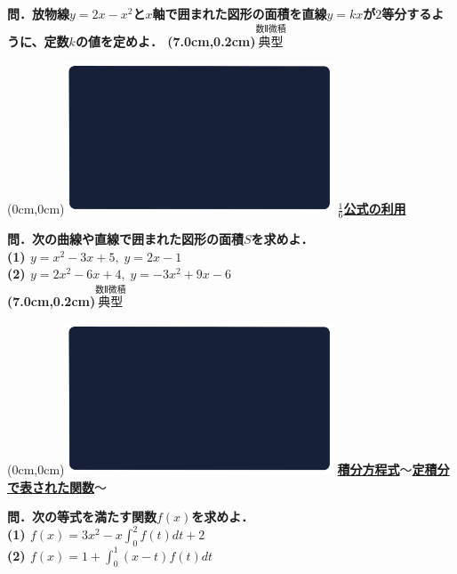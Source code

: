 \documentclass[10pt,
fleqn,
dvipdfmx,
uplatex
]{jsarticle}
\begin{document}
\LARGE 
\bf\boldmath 問．放物線$y=2x-x^2$と$x$軸で囲まれた図形の面積を直線$y=kx$が$2$等分するように、定数$k$の値を定めよ．
\at(7.0cm,0.2cm){\small\color{bradorange}$\overset{\text{数Ⅱ微積}}{\text{典型}}$}


\newpage



\at(0cm,0cm){\includegraphics[width=8cm,bb=0 0 1920 1080]{./youtube/thumbnails/templates/smart_background/数II微積.jpeg}}
{\color{orange}\bf\boldmath\LARGE\underline{$\displaystyle\frac{1}{6}$公式の利用}}\vspace{0.3zw}

\Large 
\bf\boldmath 問．次の曲線や直線で囲まれた図形の面積$S$を求めよ．\\
(1)  $y=x^2-3x+5,\;y=2x-1$\\
(2)  $y=2x^2-6x+4,\;y=-3x^2+9x-6$\\

\at(7.0cm,0.2cm){\small\color{bradorange}$\overset{\text{数Ⅱ微積}}{\text{典型}}$}


\newpage



\at(0cm,0cm){\includegraphics[width=8cm,bb=0 0 1920 1080]{./youtube/thumbnails/templates/smart_background/数II微積.jpeg}}
{\color{orange}\bf\boldmath\normalsize\underline{積分方程式$〜$定積分で表された関数$〜$}}\vspace{0.3zw}

\Large 
\bf\boldmath 問．次の等式を満たす関数$f\left(x\right)$を求めよ．\\
(1)  $f\left(x\right)=3x^2-x\displaystyle\int_0^2f\left(t\right)dt+2$\\
(2)  $f\left(x\right)=1+\displaystyle\int_0^1\left(x-t\right)f\left(t\right)dt$\\
\end{document}
